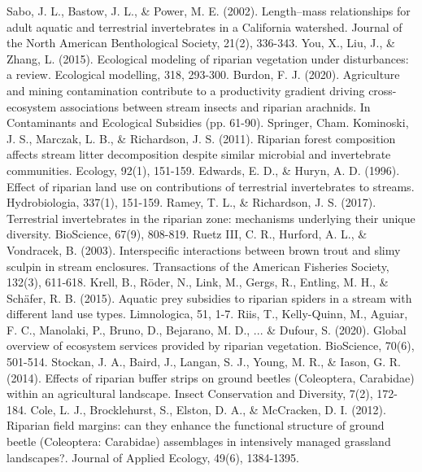\documentclass[12pt]{article}
\numberwithin{equation}{section}
\begin{document}
\begin{thebibliography}{99}
  Sabo, J. L., Bastow, J. L., \& Power, M. E. (2002). Length–mass relationships for adult aquatic and terrestrial invertebrates in a California watershed. Journal of the North American Benthological Society, 21(2), 336-343.
  You, X., Liu, J., \& Zhang, L. (2015). Ecological modeling of riparian vegetation under disturbances: a review. Ecological modelling, 318, 293-300.
  Burdon, F. J. (2020). Agriculture and mining contamination contribute to a productivity gradient driving cross-ecosystem associations between stream insects and riparian arachnids. In Contaminants and Ecological Subsidies (pp. 61-90). Springer, Cham.
  Kominoski, J. S., Marczak, L. B., \& Richardson, J. S. (2011). Riparian forest composition affects stream litter decomposition despite similar microbial and invertebrate communities. Ecology, 92(1), 151-159.
  Edwards, E. D., \& Huryn, A. D. (1996). Effect of riparian land use on contributions of terrestrial invertebrates to streams. Hydrobiologia, 337(1), 151-159.
  Ramey, T. L., \& Richardson, J. S. (2017). Terrestrial invertebrates in the riparian zone: mechanisms underlying their unique diversity. BioScience, 67(9), 808-819.
  Ruetz III, C. R., Hurford, A. L., \& Vondracek, B. (2003). Interspecific interactions between brown trout and slimy sculpin in stream enclosures. Transactions of the American Fisheries Society, 132(3), 611-618.
  Krell, B., Röder, N., Link, M., Gergs, R., Entling, M. H., \& Schäfer, R. B. (2015). Aquatic prey subsidies to riparian spiders in a stream with different land use types. Limnologica, 51, 1-7.
  Riis, T., Kelly-Quinn, M., Aguiar, F. C., Manolaki, P., Bruno, D., Bejarano, M. D., ... \& Dufour, S. (2020). Global overview of ecosystem services provided by riparian vegetation. BioScience, 70(6), 501-514.
  Stockan, J. A., Baird, J., Langan, S. J., Young, M. R., \& Iason, G. R. (2014). Effects of riparian buffer strips on ground beetles (Coleoptera, Carabidae) within an agricultural landscape. Insect Conservation and Diversity, 7(2), 172-184.
  Cole, L. J., Brocklehurst, S., Elston, D. A., \& McCracken, D. I. (2012). Riparian field margins: can they enhance the functional structure of ground beetle (Coleoptera: Carabidae) assemblages in intensively managed grassland landscapes?. Journal of Applied Ecology, 49(6), 1384-1395.

\end{thebibliography}
\end{document}
